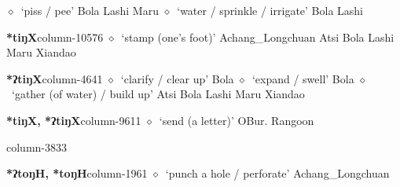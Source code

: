          $\diamond$~`piss / pee'
         Bola 
\hspace{1ex}
         Lashi 
\hspace{1ex}
         Maru 
\hspace{1ex}
         $\diamond$~`water / sprinkle / irrigate'
         Bola 
\hspace{1ex}
         Lashi 
  \item {\footnotesize \textbf{*tiŋX}}{\tiny column-10576}
         $\diamond$~`stamp (one's foot)'
         Achang\_Longchuan 
\hspace{1ex}
         Atsi 
\hspace{1ex}
         Bola 
\hspace{1ex}
         Lashi 
\hspace{1ex}
         Maru 
\hspace{1ex}
         Xiandao 
  \item {\footnotesize \textbf{*ʔtiŋX}}{\tiny column-4641}
         $\diamond$~`clarify / clear up'
         Bola 
\hspace{1ex}
         $\diamond$~`expand / swell'
         Bola 
\hspace{1ex}
         $\diamond$~`gather (of water) / build up'
         Atsi 
\hspace{1ex}
         Bola 
\hspace{1ex}
         Lashi 
\hspace{1ex}
         Maru 
\hspace{1ex}
         Xiandao 
  \item {\footnotesize \textbf{*tiŋX, *ʔtiŋX}}{\tiny column-9611}
         $\diamond$~`send (a letter)'
         OBur. 
\hspace{1ex}
         Rangoon 
  \item {\footnotesize \textbf{}}{\tiny column-3833}
  \item {\footnotesize \textbf{*ʔtoŋH, *toŋH}}{\tiny column-1961}
         $\diamond$~`punch a hole / perforate'
         Achang\_Longchuan 
